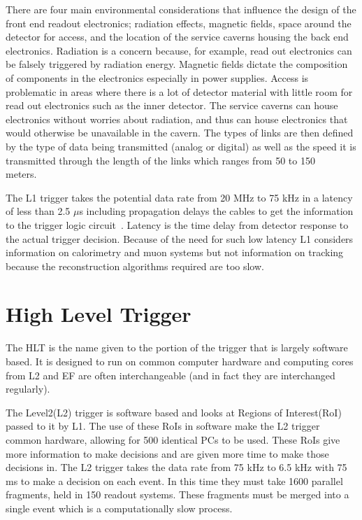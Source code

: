 There are four main environmental considerations that influence the design of the front end readout electronics; radiation effects, magnetic fields, space around the detector for access, and the location of the service caverns housing the back end electronics. Radiation is a concern because, for example, read out electronics can be falsely triggered by radiation energy. Magnetic fields dictate the composition of components in the electronics especially in power supplies. Access is problematic in areas where there is a lot of detector material with little room for read out electronics such as the inner detector. The service caverns can house electronics without worries about radiation, and thus can house electronics that would otherwise be unavailable in the cavern. The types of links are then defined by the type of data being transmitted (analog or digital) as well as the speed it is transmitted through the length of the links which ranges from 50 to 150 meters.~\cite{Green:1221848}~\cite{DETECTORS}

The L1 trigger takes the potential data rate from 20 MHz to 75 kHz in a latency of less than 2.5 $\mu$s including propagation delays the cables to get the information to the trigger logic circuit~\cite{Green:1221848}. Latency is the time delay from detector response to the actual trigger decision. Because of the need for such low latency L1 considers information on calorimetry and muon systems but not information on tracking because the reconstruction algorithms required are too slow.~\cite{DETECTORS}


\section{High Level Trigger}
\label{SECTION-TRIGGERS-HLT}

The HLT is the name given to the portion of the trigger that is largely software based. It is designed to run on common computer hardware and computing cores from L2 and EF are often interchangeable (and in fact they are interchanged regularly). 

The Level2(L2) trigger is software based and looks at Regions of Interest(RoI) passed to it by L1. The use of these RoIs in software make the L2 trigger common hardware, allowing for 500 identical PCs to be used. These RoIs give more information to make decisions and are given more time to make those decisions in. The L2 trigger takes the data rate from 75 kHz to 6.5 kHz with 75 ms to make a decision on each event. In this time they must take 1600 parallel fragments, held in 150 readout systems. These fragments must be merged into a single event which is a computationally slow process. 

